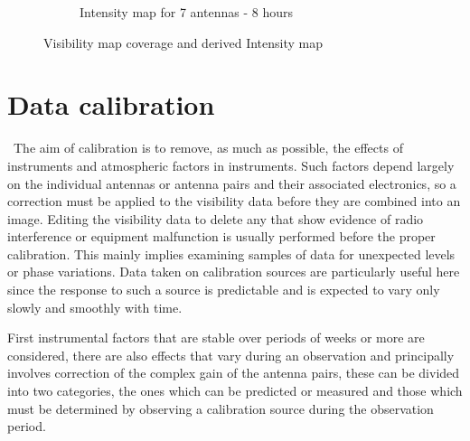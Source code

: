 \begin{figure}
\begin{subfigure}[b]{0.5\textwidth}
                \caption{Intensity map for 7 antennas - 8 hours}
                \label{fig:lm7ant8h}
        \end{subfigure}%
        \caption[Visibility map coverage and derived Intensity map]{ Visibility map coverage and derived Intensity map~\citep[Slide 28,33,36,38]{wilner.siw2014}}\label{fig:weighting2}
\end{figure}
\newpage
\section{Data calibration}
{\citep[From][Sec.~10.1~Pgs.~383-385]{thompson2008interferometry}}~The aim of calibration is to remove, as much as possible, the effects of instruments and atmospheric factors in instruments. Such factors depend largely on the individual antennas or antenna pairs and their associated electronics, so a correction must be applied to the visibility data before they are combined into an image. Editing the visibility data to delete any that show evidence of radio interference or equipment malfunction is usually performed before the proper calibration. This mainly implies examining samples of data for unexpected levels or phase variations. Data taken on calibration sources are particularly useful here since the response to such a source is predictable and is expected to vary only slowly and smoothly with time.

First instrumental factors that are stable over periods of weeks or more are considered, there are also effects that vary during an observation and principally involves correction of the complex gain of the antenna pairs, these can be divided into two categories, the ones which can be predicted or measured and those which must be determined by observing a calibration source during the observation period.
